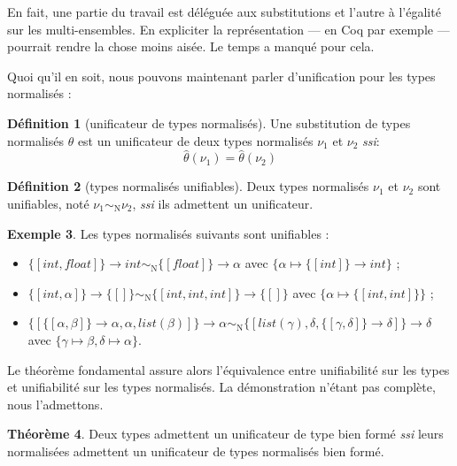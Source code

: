 \documentclass[a4paper]{report}
\theoremstyle{definition}
\newtheorem{theoreme}{Théorème}
\newtheorem{definition}[theoreme]{Définition}
\newtheorem{exemple}[theoreme]{Exemple}
\newcommand{\mset}[1]{\{\![#1]\!\}}
\newcommand{\ssi}{\textit{ssi}\xspace}
\newcommand{\N}{\mathrm{N}}
\begin{document}
En fait, une partie du travail est déléguée aux substitutions et l'autre à l'égalité sur les multi-ensembles. En expliciter la représentation — en Coq par exemple — pourrait rendre la chose moins aisée. Le temps a manqué pour cela.

Quoi qu'il en soit, nous pouvons maintenant parler d'unification pour les types normalisés :

\begin{definition}[unificateur de types normalisés]
  Une substitution de types normalisés $\theta$ est un unificateur de deux types normalisés $\nu_1$ et $\nu_2$ \ssi :
  \[ \hat\theta (\nu_1) = \hat\theta (\nu_2) \]
\end{definition}

\begin{definition}[types normalisés unifiables]
  Deux types normalisés $\nu_1$ et $\nu_2$ sont unifiables, noté $\nu_1 \sim_\N \nu_2$, \ssi ils admettent un unificateur.
\end{definition}

\begin{exemple}
  Les types normalisés suivants sont unifiables :
  \begin{itemize}
    \item $\mset{int, float} \rightarrow int \sim_\N \mset{float} \rightarrow \alpha$ avec $\{ \alpha \mapsto \mset{int} \rightarrow int \}$ ;
    \item $\mset{int, \alpha} \rightarrow \mset{} \sim_\N \mset{int, int, int} \rightarrow \mset{}$ avec $\{ \alpha \mapsto \mset{int, int} \}$ ;
    \item $\mset{\mset{\alpha, \beta} \rightarrow \alpha, \alpha, list (\beta)} \rightarrow \alpha \sim_\N \mset{list (\gamma), \delta, \mset{\gamma, \delta} \rightarrow \delta} \rightarrow \delta$ \\ avec $\{ \gamma \mapsto \beta, \delta \mapsto \alpha \}$.
  \end{itemize}
\end{exemple}

Le théorème fondamental assure alors l'équivalence entre unifiabilité sur les types et unifiabilité sur les types normalisés. La démonstration n'étant pas complète, nous l'admettons.

\begin{theoreme}
  Deux types admettent un unificateur de type bien formé \ssi leurs normalisées admettent un unificateur de types normalisés bien formé.
\end{theoreme}
\end{document}
